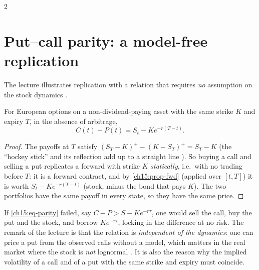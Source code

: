 \begin{paracol}{2}
\section{Put--call parity: a model-free replication}\label{ch15:sec-parity}
The lecture illustrates replication with a relation that requires \emph{no} assumption on the stock dynamics .

\begin{theorem}\label{ch15:thm-parity}
For European options on a non-dividend-paying asset with the same strike $K$ and expiry $T$, in the absence of arbitrage,
\begin{equation}\label{ch15:eq-parity}
  C(t)-P(t)=S_t-Ke^{-r(T-t)}.
\end{equation}
\end{theorem}
\begin{proof}
The payoffs at $T$ satisfy $(S_T-K)^+-(K-S_T)^+=S_T-K$ (the ``hockey stick'' and its reflection add up to a straight line ). So buying a call and selling a put
replicates a forward with strike $K$ \emph{statically}, i.e.\ with no trading before $T$: it is a forward contract, and by
\cref{ch15:prop-fwd} (applied over $[t,T]$) it is worth $S_t-Ke^{-r(T-t)}$ (stock, minus the bond that pays $K$). The two portfolios have the same payoff in every state, so they have the same price. 
\end{proof}
If \eqref{ch15:eq-parity} failed, say $C-P>S-Ke^{-r\tau}$, one would sell the call, buy the put and the stock, and borrow $Ke^{-r\tau}$, locking in the difference at no risk. The remark of the lecture is that the relation is
\emph{independent of the dynamics}: one can price a put from the observed calls without a model, which matters in the real market where the stock is \emph{not} lognormal
. It is also the reason why the implied volatility of a call and of a put with the same strike and expiry must coincide.


\end{paracol}
